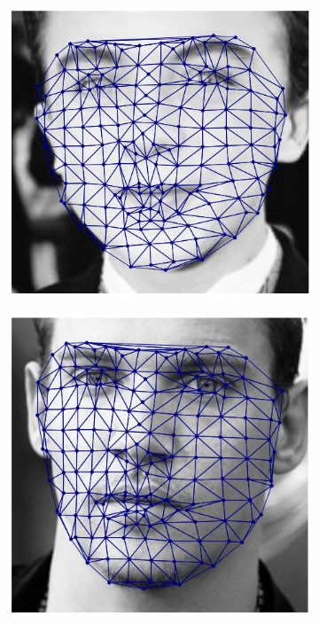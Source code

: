 \begin{figure}[!h]
\begin{subfigure}[b]{0.115\textwidth}
    \end{subfigure}
    \begin{subfigure}[b]{0.115\textwidth}
            \includegraphics[height=1\textwidth]{supports/Fittings/fitting_face_0003}
    \end{subfigure}
    \begin{subfigure}[b]{0.115\textwidth}
            \includegraphics[height=1\textwidth]{supports/Fittings/fitting_face_0006}

\end{subfigure}
\end{figure}
